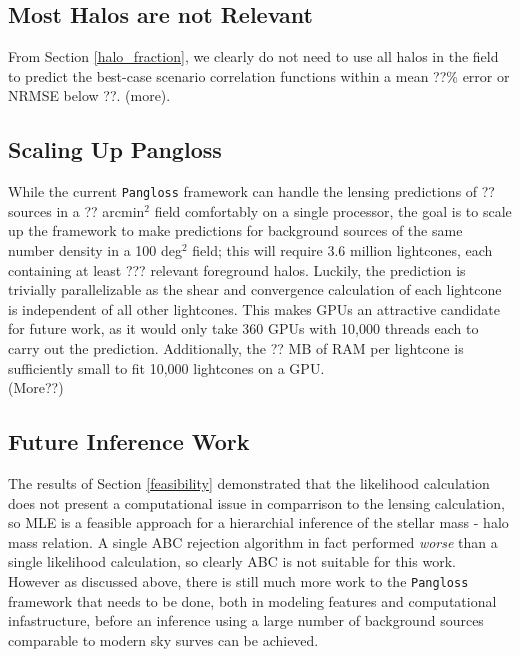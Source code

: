 \documentclass[%
 reprint,
 amsmath,amssymb,
 aps,nofootinbib
]{revtex4-1}
\begin{document}
\subsection{Most Halos are not Relevant}

From Section \ref{halo_fraction}, we clearly do not need to use all halos in the field to predict the best-case scenario correlation functions within a mean ??\% error or NRMSE below ??. (more).


\subsection{Scaling Up Pangloss}

While the current \texttt{Pangloss} framework can handle the lensing predictions of ?? sources in a ?? arcmin$^2$ field comfortably on a single processor, the goal is to scale up the framework to make predictions for background sources of the same number density in a 100 deg$^2$ field; this will require 3.6 million lightcones, each containing at least ??? relevant foreground halos. Luckily, the prediction is trivially parallelizable as the shear and convergence calculation of each lightcone is independent of all other lightcones. This makes GPUs an attractive candidate for future work, as it would only take 360 GPUs with 10,000 threads each to carry out the prediction. Additionally, the ?? MB of RAM per lightcone is sufficiently small to fit 10,000 lightcones on a GPU.\\

(More??)


\subsection{Future Inference Work}

The results of Section \ref{feasibility} demonstrated that the likelihood calculation does not present a computational issue in comparrison to the lensing calculation, so MLE is a feasible approach for a hierarchial inference of the stellar mass - halo mass relation. A single ABC rejection algorithm in fact performed \textit{worse} than a single likelihood calculation, so clearly ABC is not suitable for this work. However as discussed above, there is still much more work to the \texttt{Pangloss} framework that needs to be done, both in modeling features and computational infastructure, before an inference using a large number of background sources comparable to modern sky surves can be achieved.
\end{document}

